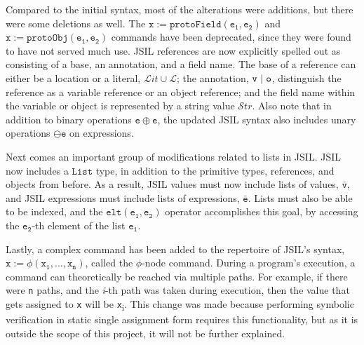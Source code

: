 \documentclass[a4paper,11pt,twoside]{report}
\begin{document}
Compared to the initial syntax, most of the alterations were additions, but there were some deletions as well. The $\mathtt{x := protoField(e_1, e_2)}$ and $\mathtt{x := protoObj(e_1, e_2)}$ commands have been deprecated, since they were found to have not served much use. JSIL references are now explicitly spelled out as consisting of a base, an annotation, and a field name. The base of a reference can either be a location or a literal, $\mathcal{L}it \cup \mathcal{L}$; the annotation, $\mathtt{v} \hspace{3pt}|\hspace{3pt} \mathtt{o}$, distinguish the reference as a variable reference or an object reference; and the field name within the variable or object is represented by a string value $\mathcal{S}tr$. Also note that in addition to binary operations $\mathtt{e} \oplus \mathtt{e}$, the updated JSIL syntax also includes unary operations $\ominus \mathtt{e}$ on expressions.

Next comes an important group of modifications related to lists in JSIL. JSIL now includes a $\mathtt{List}$ type, in addition to the primitive types, references, and objects from before. As a result, JSIL values must now include lists of values, $\bar{\mathtt{v}}$, and JSIL expressions must include lists of expressions, $\bar{\mathtt{e}}$. Lists must also be able to be indexed, and the $\mathtt{elt (e_1, e_2)}$ operator accomplishes this goal, by accessing the $\mathtt{e_2}$-th element of the list $\mathtt{e_1}$. 

Lastly, a complex command has been added to the repertoire of JSIL's syntax, $\mathtt{x} := \phi(\mathtt{x_1}, ... , \mathtt{x_n})$, called the $\phi$-node command. During a program's execution, a command can theoretically be reached via multiple paths. For example, if there were \texttt{n} paths, and the \textit{i}-th path was taken during execution, then the value that gets assigned to \texttt{x} will be \texttt{x}\textsubscript{i}. This change was made because performing symbolic verification in static single assignment form requires this functionality, but as it is outside the scope of this project, it will not be further explained.
\end{document}
